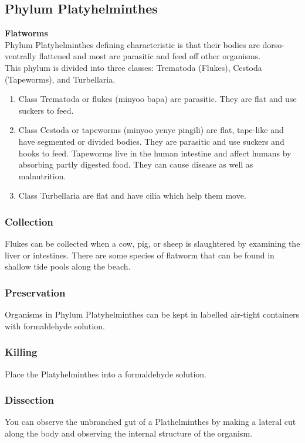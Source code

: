 \subsection{Phylum Platyhelminthes}
\textbf{Flatworms}\\ 
Phylum Platyhelminthes defining characteristic is that their bodies are dorso-ventrally flattened and most are parasitic and feed off other organisms.\\
This phylum is divided into three classes: Trematoda (Flukes), Cestoda (Tapeworms), and Turbellaria.
\begin{enumerate}
\item{Class Trematoda or flukes (minyoo bapa) are parasitic. They are flat and use suckers to feed.}
\item{Class Cestoda or tapeworms (minyoo yenye pingili) are flat, tape-like and have segmented or divided bodies. They are parasitic and use suckers and hooks to feed. Tapeworms live in the human intestine and affect humans by absorbing partly digested food. They can cause disease as well as malnutrition.}
\item{Class Turbellaria are flat and have cilia which help them move.}
\end{enumerate}

\subsubsection{Collection}
 Flukes can be collected when a cow, pig, or sheep is slaughtered by examining the liver or intestines. There are some species of flatworm that can be found in shallow tide pools along the beach. 

\subsubsection{Preservation} 
Organisms in Phylum Platyhelminthes can be kept in labelled air-tight containers with formaldehyde solution.

\subsubsection{Killing}
Place the Platyhelminthes into a formaldehyde solution.

\subsubsection{Dissection}
You can observe the unbranched gut of a Plathelminthes by making a lateral cut along the body and observing the internal structure of the organism.


